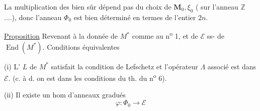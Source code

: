 La multiplication des   bien sûr dépend pas du choix de $\mathbf M_0,\xi_0$ (  sur l'anneau $\mathbb Z$ ....), donc l'anneau $\Phi_0$ est bien déterminé en termes de l'entier  $2n$.

\uline{Proposition} Revenant à la donnée de $M^*$ comme au n\textsuperscript{o} 1, et de $\mathcal E$ ss-  de  $\operatorname{End}(M^*)$.
Conditions équivalentes

(i) L' $L$ de $M^*$ satisfait la condition de  Lefschetz et l'opérateur $\Lambda$ associé est dans $\mathcal E$.
(c. à d. on est dans les conditions du th. du n\textsuperscript{o} 6).

(ii) Il existe un hom d'anneaux gradués
\[
\varphi:\Phi_0\longrightarrow\mathcal E
\]
